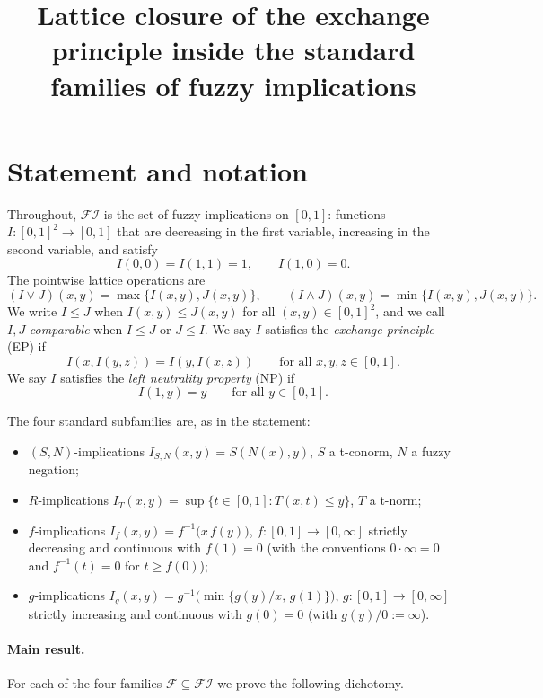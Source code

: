 \documentclass{amsart}
\theoremstyle{plain}
\theoremstyle{definition}
\newcommand{\FI}{\mathcal{FI}}
\newcommand{\Fcal}{\mathcal{F}}
\begin{document}
\title{Lattice closure of the exchange principle inside the standard families of fuzzy implications}
\maketitle

\section{Statement and notation}

Throughout, $\FI$ is the set of fuzzy implications on $[0,1]$: functions
$I\colon[0,1]^2\to[0,1]$ that are decreasing in the first variable, increasing in the
second variable, and satisfy
\begin{equation}\label{eq:bnd}
I(0,0)=I(1,1)=1,\qquad I(1,0)=0 .
\end{equation}
The pointwise lattice operations are
\[
(I\vee J)(x,y)=\max\{I(x,y),J(x,y)\},\qquad
(I\wedge J)(x,y)=\min\{I(x,y),J(x,y)\}.
\]
We write $I\le J$ when $I(x,y)\le J(x,y)$ for all $(x,y)\in[0,1]^2$, and we call $I,J$
\emph{comparable} when $I\le J$ or $J\le I$. We say $I$ satisfies the \emph{exchange
principle} (EP) if
\begin{equation}\label{eq:EP}
I(x,I(y,z))=I(y,I(x,z))\qquad\text{for all }x,y,z\in[0,1].
\end{equation}
We say $I$ satisfies the \emph{left neutrality property} (NP) if
\begin{equation}\label{eq:NP}
I(1,y)=y\qquad\text{for all }y\in[0,1].
\end{equation}

The four standard subfamilies are, as in the statement:
\begin{itemize}
\item $(S,N)$-implications $I_{S,N}(x,y)=S(N(x),y)$, $S$ a t-conorm, $N$ a fuzzy negation;
\item $R$-implications $I_T(x,y)=\sup\{t\in[0,1]:T(x,t)\le y\}$, $T$ a t-norm;
\item $f$-implications $I_f(x,y)=f^{-1}\!\bigl(x\,f(y)\bigr)$, $f\colon[0,1]\to[0,\infty]$
strictly decreasing and continuous with $f(1)=0$ (with the conventions
$0\cdot\infty=0$ and $f^{-1}(t)=0$ for $t\ge f(0)$);
\item $g$-implications $I_g(x,y)=g^{-1}\!\bigl(\min\{g(y)/x,\,g(1)\}\bigr)$,
$g\colon[0,1]\to[0,\infty]$ strictly increasing and continuous with $g(0)=0$
(with $g(y)/0:=\infty$).
\end{itemize}

\paragraph{Main result.}
For each of the four families $\Fcal\subseteq\FI$ we prove the following dichotomy.
\end{document}
